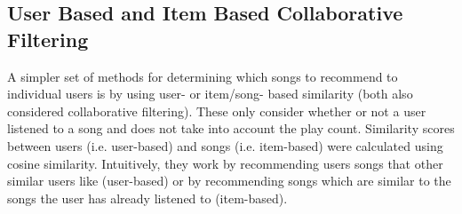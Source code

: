 \documentclass[12pt,preprint]{aastex}
\begin{document}
%


%


\subsection{User Based and Item Based Collaborative Filtering}

A simpler set of methods for determining which songs to recommend to individual users is by using user- or item/song- based similarity (both also considered collaborative filtering). These only consider whether or not a user listened to a song and does not take into account the play count. Similarity scores between users (i.e. user-based) and songs (i.e. item-based) were calculated using cosine similarity. Intuitively, they work by recommending users songs that other similar users like (user-based) or by recommending songs which are similar to the songs the user has already listened to (item-based).
\end{document}
